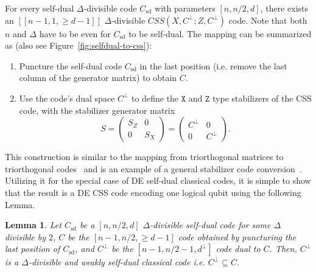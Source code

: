 \documentclass[journal]{IEEEtran}
\newtheorem{lemma}[theorem]{Lemma}
\begin{document}
For every self-dual $\Delta$-divisible code $C_{\textrm{sd}}$ with parameters $[n,n/2,d]$, there exists an $[[n-1,1,\geq d-1]]$ $\Delta$-divisible $CSS(X,C^\perp;Z,C^\perp)$ code. Note that both $n$ and $\Delta$ have to be even for $C_{\textrm{sd}}$ to be self-dual. The mapping can be summarized as (also see Figure~\ref{fig:selfdual-to-css}):

\begin{enumerate}
    \item Puncture the self-dual code $C_{\textrm{sd}}$ in the last position (i.e. remove the last column of the generator matrix) to obtain $C$.
    \item Use the code's dual space $C^\perp$ to define the $\texttt{X}$ and $\texttt{Z}$ type stabilizers of the CSS code, with the stabilizer generator matrix
    $$S=\begin{pmatrix}
    S_Z & 0\\
    0 & S_X
    \end{pmatrix}=\begin{pmatrix}
    C^\perp & 0\\
    0 & C^\perp
    \end{pmatrix}.$$
\end{enumerate}

This construction is similar to the mapping from triorthogonal matrices to triorthogonal codes~\cite{haah_towers_2018, bravyi_magic-state_2012} and is an example of a general stabilizer code conversion~\cite{ketkar_nonbinary_2005}. Utilizing it for the special case of DE self-dual classical codes, it is simple to show that the result is a DE CSS code encoding one logical qubit using the following Lemma.


\begin{lemma}\label{lemma:Cperp-seldual}
Let $C_{\textrm{sd}}$ be a $[n,n/2,d]$ $\Delta$-divisible self-dual code for some $\Delta$ divisible by $2$, $C$ be the $[n-1,n/2,\geq d-1]$ code obtained by puncturing the last position of $C_\textrm{sd}$, and $C^\perp$ be the $[n-1,n/2-1,d^\perp]$ code dual to $C$. Then, $C^\perp$ is a $\Delta$-divisible and weakly self-dual classical code i.e. $C^\perp \subseteq C$. 
\end{lemma}
\end{document}
